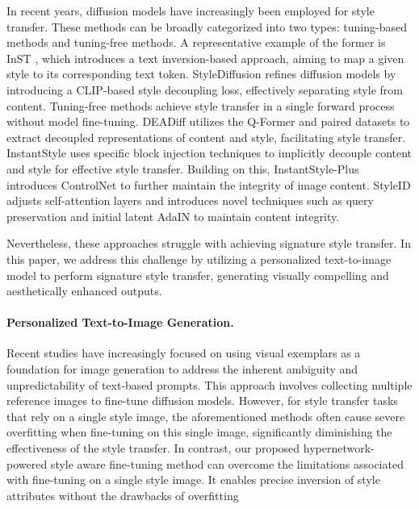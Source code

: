 In recent years, diffusion models have increasingly been employed for style transfer. These methods can be broadly categorized into two types: tuning-based methods and tuning-free methods. A representative example of the former is InST \cite{zhang2023inversion}, which introduces a text inversion-based approach, aiming to map a given style to its corresponding text token. 
StyleDiffusion \cite{wang2023stylediffusion} refines diffusion models by introducing a CLIP-based style decoupling loss, effectively separating style from content. 
Tuning-free methods achieve style transfer in a single forward process without model fine-tuning. DEADiff \cite{qi2024deadiff} utilizes the Q-Former \cite{li2023blip} and paired datasets to extract decoupled representations of content and style, facilitating style transfer. InstantStyle \cite{wang2024instantstyle} uses specific block injection techniques to implicitly decouple content and style for effective style transfer. Building on this, InstantStyle-Plus \cite{wang2024instantstyleplus} introduces ControlNet \cite{zhang2023adding} to further maintain the integrity of image content. StyleID \cite{chung2024style} adjusts self-attention layers and introduces novel techniques such as query preservation and initial latent AdaIN to maintain content integrity.

Nevertheless, these approaches struggle with achieving signature style transfer. In this paper, we address this challenge by utilizing a personalized text-to-image model to perform signature style transfer, generating visually compelling and aesthetically enhanced outputs.  


\paragraph{\textbf{Personalized Text-to-Image Generation.}} 

Recent studies \cite{ruiz2023dreambooth, gal2022image, ruiz2023hyperdreambooth, kumari2023multi} have increasingly focused on using visual exemplars as a foundation for image generation to address the inherent ambiguity and unpredictability of text-based prompts. This approach involves collecting multiple reference images to fine-tune diffusion models. 
However, for style transfer tasks that rely on a single style image, the aforementioned methods often cause severe overfitting when fine-tuning on this single image, significantly diminishing the effectiveness of the style transfer.
In contrast, our proposed hypernetwork-powered style aware fine-tuning method can overcome the limitations associated with fine-tuning on a single style image. It enables precise inversion of style attributes without the drawbacks of overfitting

